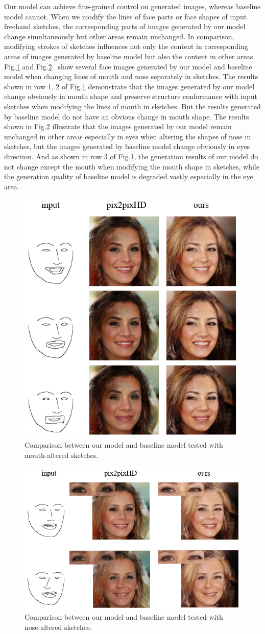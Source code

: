 \documentclass[10pt,twocolumn,letterpaper]{article}
\begin{document}
Our model can achieve fine-grained control on generated images, whereas baseline model cannot. When we modify the lines of face parts or face shapes of input freehand sketches, the corresponding parts of images generated by our model change simultaneously but other areas remain unchanged. 
In comparison, modifying strokes of sketches influences not only the content in corresponding areas of images generated by baseline model but also the content in other areas. 
Fig.\ref{fig:compare_2} and Fig.\ref{fig:compare_3}~ show several face images generated by our model and baseline model when changing lines of mouth and nose separately in sketches.
The results shown in row 1, 2 of Fig.\ref{fig:compare_2} demonstrate that the images generated by our model change obviously in mouth shape and preserve structure conformance with input sketches when modifying the lines of mouth in sketches. But the results generated by baseline model do not have an obvious change in mouth shape.
The results shown in Fig.\ref{fig:compare_3} illustrate that the images generated by our model remain unchanged in other areas especially in eyes when altering the shapes of nose in sketches, but the images generated by baseline model change obviously in eyes direction. And as shown in row 3 of Fig.\ref{fig:compare_2}, the generation results of our model do not change except the mouth when modifying the mouth shape in sketches, while the generation quality of baseline model is degraded vastly especially in the eye area. 
\begin{figure}[htb]
	\centering
	\includegraphics[width=0.4 \textwidth]{mouth_editing.png}
	\caption{Comparison between our model and baseline model tested with mouth-altered sketches. }
	\label{fig:compare_2}
\end{figure}

\begin{figure}[htb]
	\centering
	\includegraphics[width=0.45 \textwidth]{nose_editing.png}
	\caption{Comparison between our model and baseline model tested with nose-altered sketches.}
	\label{fig:compare_3}
\end{figure}
\end{document}
